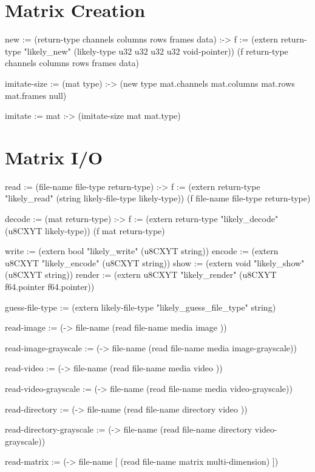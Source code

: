 \documentclass[twoside=false, numbers=noenddot]{scrbook}
\newenvironment{likely}
{ \verbatim }
{ \endverbatim }
\begin{document}
\section{Matrix Creation}
\begin{likely}
new :=
  (return-type channels columns rows frames data) :->
  {
    f := (extern return-type
                 "likely_new"
                 (likely-type u32 u32 u32 u32 void-pointer))
    (f return-type channels columns rows frames data)
  }

imitate-size :=
  (mat type) :->
    (new type mat.channels mat.columns mat.rows mat.frames null)

imitate :=
  mat :->
    (imitate-size mat mat.type)
\end{likely}

\section{Matrix I/O}
\begin{likely}
read :=
  (file-name file-type return-type) :->
  {
    f := (extern return-type
                 "likely_read"
                 (string likely-file-type likely-type))
    (f file-name file-type return-type)
  }

decode :=
  (mat return-type) :->
  {
    f := (extern return-type
                 "likely_decode"
                 (u8CXYT likely-type))
    (f mat return-type)
  }

write  := (extern bool   "likely_write"  (u8CXYT string))
encode := (extern u8CXYT "likely_encode" (u8CXYT string))
show   := (extern void   "likely_show"   (u8CXYT string))
render := (extern u8CXYT "likely_render" (u8CXYT f64.pointer f64.pointer))

guess-file-type :=
  (extern likely-file-type "likely_guess_file_type" string)
\end{likely}

\begin{likely}
read-image :=
  (-> file-name (read file-name media     image          ))

read-image-grayscale :=
  (-> file-name (read file-name media     image-grayscale))

read-video :=
  (-> file-name (read file-name media     video          ))

read-video-grayscale :=
  (-> file-name (read file-name media     video-grayscale))

read-directory :=
  (-> file-name (read file-name directory video          ))

read-directory-grayscale :=
  (-> file-name (read file-name directory video-grayscale))

read-matrix :=
  (-> file-name [ (read file-name matrix multi-dimension) ])
\end{likely}
\end{document}
